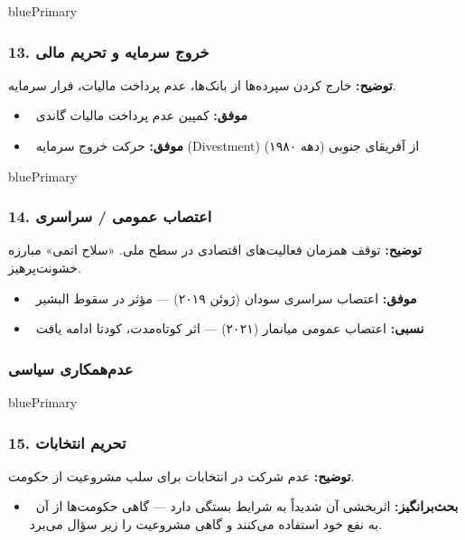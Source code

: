 \documentclass[a4paper,12pt]{article}
\newcommand{\success}[1]{\textcolor{greenPrimary}{\faCheckCircle\ \textbf{موفق:}} #1}
\newcommand{\partialresult}[1]{\textcolor{yellowPrimary}{\faExclamationTriangle\ \textbf{نسبی:}} #1}
\newcommand{\debate}[1]{\textcolor{orangePrimary}{\faQuestionCircle\ \textbf{بحث‌برانگیز:}} #1}
\newcommand{\methodnum}[1]{\textcolor{purpleLight}{\textbf{#1.}}}
\begin{document}
\begin{methodcard}{bluePrimary}
\subsubsection{\methodnum{13} خروج سرمایه و تحریم مالی}
\textbf{توضیح:} خارج کردن سپرده‌ها از بانک‌ها، عدم پرداخت مالیات، فرار سرمایه.

\begin{itemize}[label=\textcolor{greenPrimary}{\faCheckCircle}]
  \item \success{کمپین عدم پرداخت مالیات گاندی}
  \item \success{حرکت خروج سرمایه (Divestment) از آفریقای جنوبی (دهه ۱۹۸۰)}
\end{itemize}
\end{methodcard}

\begin{methodcard}{bluePrimary}
\subsubsection{\methodnum{14} اعتصاب عمومی / سراسری}
\textbf{توضیح:} توقف همزمان فعالیت‌های اقتصادی در سطح ملی. «سلاح اتمی» مبارزه خشونت‌پرهیز.

\begin{itemize}[label=\textcolor{greenPrimary}{\faCheckCircle}]
  \item \success{اعتصاب سراسری سودان (ژوئن ۲۰۱۹) — مؤثر در سقوط البشیر}
\end{itemize}
\begin{itemize}[label=\textcolor{yellowPrimary}{\faExclamationTriangle}]
  \item \partialresult{اعتصاب عمومی میانمار (۲۰۲۱) — اثر کوتاه‌مدت، کودتا ادامه یافت}
\end{itemize}
\end{methodcard}

\subsubsection*{عدم‌همکاری سیاسی}

\begin{methodcard}{bluePrimary}
\subsubsection{\methodnum{15} تحریم انتخابات}
\textbf{توضیح:} عدم شرکت در انتخابات برای سلب مشروعیت از حکومت.

\begin{itemize}[label=\textcolor{yellowPrimary}{\faExclamationTriangle}]
  \item \debate{اثربخشی آن شدیداً به شرایط بستگی دارد — گاهی حکومت‌ها از آن به نفع خود استفاده می‌کنند و گاهی مشروعیت را زیر سؤال می‌برد.}
\end{itemize}
\end{methodcard}
\end{document}
